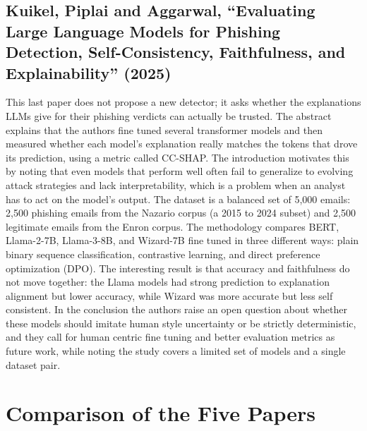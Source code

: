 \documentclass[10pt,a4paper]{article}
\begin{document}
\subsection{Kuikel, Piplai and Aggarwal, ``Evaluating Large Language Models for Phishing Detection, Self-Consistency, Faithfulness, and Explainability'' (2025)}

This last paper does not propose a new detector; it asks whether the explanations LLMs give for their phishing verdicts can actually be trusted. The abstract explains that the authors fine tuned several transformer models and then measured whether each model's explanation really matches the tokens that drove its prediction, using a metric called CC-SHAP. The introduction motivates this by noting that even models that perform well often fail to generalize to evolving attack strategies and lack interpretability, which is a problem when an analyst has to act on the model's output. The dataset is a balanced set of 5,000 emails: 2,500 phishing emails from the Nazario corpus (a 2015 to 2024 subset) and 2,500 legitimate emails from the Enron corpus. The methodology compares BERT, Llama-2-7B, Llama-3-8B, and Wizard-7B fine tuned in three different ways: plain binary sequence classification, contrastive learning, and direct preference optimization (DPO). The interesting result is that accuracy and faithfulness do not move together: the Llama models had strong prediction to explanation alignment but lower accuracy, while Wizard was more accurate but less self consistent. In the conclusion the authors raise an open question about whether these models should imitate human style uncertainty or be strictly deterministic, and they call for human centric fine tuning and better evaluation metrics as future work, while noting the study covers a limited set of models and a single dataset pair.

\section{Comparison of the Five Papers}
\end{document}

